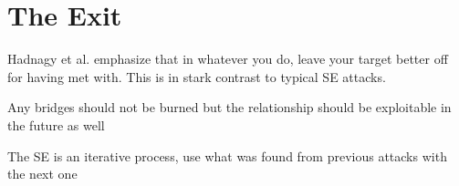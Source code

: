
\section{The Exit}

Hadnagy et al. emphasize that in whatever you do, leave your target better off for having met with. This is in stark contrast to typical SE attacks.

Any bridges should not be burned but the relationship should be exploitable in the future as well

The SE is an iterative process, use what was found from previous attacks with the next one